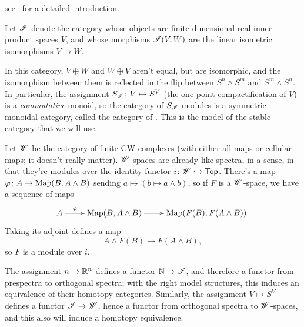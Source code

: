see~\cite{SchwedeSymmSpec} for a detailed introduction.
\begin{exm}
\label{orthogonal_spectra}
Let $\mathscr I$ denote the category whose objects are finite-dimensional real inner product spaces $V$, and whose
morphisms $\mathscr I(V,W)$ are the linear isometric isomorphisms $V\to W$.

In this category, $V\oplus W$ and $W\oplus V$ aren't equal, but are isomorphic, and the isomorphism between them is
reflected in the flip between $S^n\wedge S^m$ and $S^m\wedge S^n$. In particular, the assignment $S_\sI\colon
V\mapsto S^V$ (the one-point compactification of $V$) is a \emph{commutative} monoid, so the category of
$S_\mathscr I$-modules is a symmetric monoidal category, called the category of . This is the model of the stable category that we will use.
\end{exm}
\begin{exm}[$\sW$-spaces]
\label{wspaces}
Let $\sW$ be the category of finite CW complexes (with either all maps or cellular maps; it doesn't really matter).
$\sW$-spaces are already like spectra, in a sense, in that they're modules over the identity functor
$i\colon\mathscr W\hookrightarrow\mathsf{Top}$. There's a map $\varphi\colon A\to\operatorname{Map}(B, A\wedge B)$ sending $a\mapsto (b\mapsto a\wedge b)$, so
if $F$ is a $\sW$-space, we have a sequence of maps
\[\xymatrix{
	A\ar[r]^-\vp & \Map(B, A\wedge B)\ar[r] &\Map(F(B), F(A\wedge B)).
}\]
Taking its adjoint defines a map
\[A\wedge F(B)\longrightarrow F(A\wedge B),\]
so $F$ is a module over $i$.
\end{exm}
The assignment $n\mapsto\R^n$ defines a functor $\mathbb N\to\mathscr I$, and therefore a functor from prespectra to orthogonal
spectra; with the right model structures, this induces an equivalence of their homotopy categories. Similarly, the
assignment $V\mapsto S^V$ defines a functor $\mathscr I\to\mathscr W$, hence a functor from orthogonal spectra to $\sW$-spaces,
and this also will induce a homotopy equivalence.
